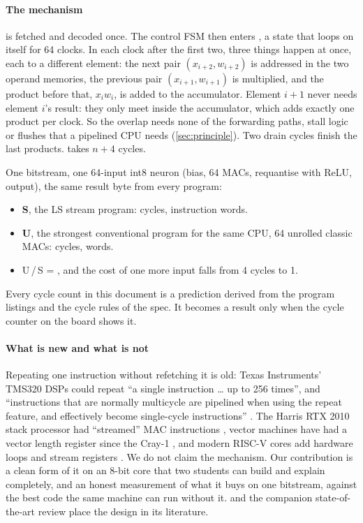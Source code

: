 \paragraph{The mechanism}  is fetched and decoded once. The control FSM then enters , a state that loops on itself for 64 clocks. In each  clock after the first two, three things happen at once, each to a different element: the next pair $(x_{i+2}, w_{i+2})$ is addressed in the two operand memories, the previous pair $(x_{i+1}, w_{i+1})$ is multiplied, and the product before that, $x_i w_i$, is added to the accumulator. Element $i+1$ never needs element $i$'s result: they only meet inside the accumulator, which adds exactly one product per clock. So the overlap needs none of the forwarding paths, stall logic or flushes that a pipelined CPU needs (\cref{sec:principle}). Two drain cycles finish the last products.  takes $n + 4$ cycles.

\begin{prediction}
One bitstream, one 64-input int8 neuron (bias, 64 MACs, requantise with ReLU, output), the same result byte from every program:
\begin{itemize}
\item \textbf{S}, the LS stream program: \pred{\cycS} cycles, \wdS{} instruction words.
\item \textbf{U}, the strongest conventional program for the same CPU, 64 unrolled classic MACs: \pred{\cycU} cycles, \wdU{} words.
\item U\,/\,S = \pred{\ratioUS$\times$}, and the cost of one more input falls from 4 cycles to 1.
\end{itemize}
Every cycle count in this document is a prediction derived from the program listings and the cycle rules of the spec. It becomes a result only when the cycle counter on the board shows it.
\end{prediction}

\paragraph{What is new and what is not} Repeating one instruction without refetching it is old: Texas Instruments' TMS320 DSPs could repeat ``a single instruction \ldots{} up to 256 times'', and ``instructions that are normally multicycle are pipelined when using the repeat feature, and effectively become single-cycle instructions'' \citep{ti1990tms320c25}. The Harris RTX 2010 stack processor had ``streamed'' MAC instructions \citep{harris_rtx}, vector machines have had a vector length register since the Cray-1 \citep{russell1978cray}, and modern RISC-V cores add hardware loops and stream registers \citep{gautschi2017near,schuiki2021ssr}. We do not claim the mechanism. Our contribution is a clean form of it on an 8-bit core that two students can build and explain completely, and an honest measurement of what it buys on one bitstream, against the best code the same machine can run without it.  and the companion state-of-the-art review place the design in its literature.

